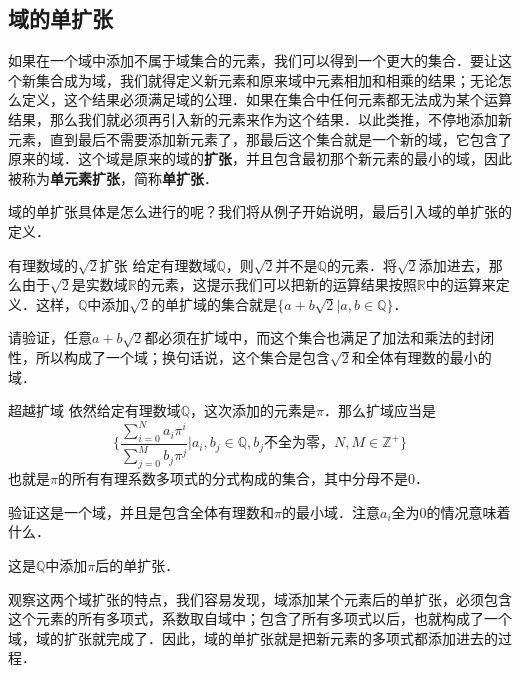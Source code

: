 

\subsection{域的单扩张}
如果在一个域中添加不属于域集合的元素，我们可以得到一个更大的集合．要让这个新集合成为域，我们就得定义新元素和原来域中元素相加和相乘的结果；无论怎么定义，这个结果必须满足域的公理．如果在集合中任何元素都无法成为某个运算结果，那么我们就必须再引入新的元素来作为这个结果．以此类推，不停地添加新元素，直到最后不需要添加新元素了，那最后这个集合就是一个新的域，它包含了原来的域．这个域是原来的域的\textbf{扩张}，并且包含最初那个新元素的最小的域，因此被称为\textbf{单元素扩张}，简称\textbf{单扩张}．

域的单扩张具体是怎么进行的呢？我们将从例子开始说明，最后引入域的单扩张的定义．

\begin{exercise}{有理数域的$\sqrt{2}$扩张}\label{FldExp_exe1}
给定有理数域$\mathbb{Q}$，则$\sqrt{2}$并不是$\mathbb{Q}$的元素．将$\sqrt{2}$添加进去，那么由于$\sqrt{2}$是实数域$\mathbb{R}$的元素，这提示我们可以把新的运算结果按照$\mathbb{R}$中的运算来定义．这样，$\mathbb{Q}$中添加$\sqrt{2}$的单扩域的集合就是$\{a+b\sqrt{2}|a, b\in\mathbb{Q}\}$．

请验证，任意$a+b\sqrt{2}$都必须在扩域中，而这个集合也满足了加法和乘法的封闭性，所以构成了一个域；换句话说，这个集合是包含$\sqrt{2}$和全体有理数的最小的域．
\end{exercise}

\begin{exercise}{超越扩域}\label{FldExp_exe2}
依然给定有理数域$\mathbb{Q}$，这次添加的元素是$\pi$．那么扩域应当是
\begin{equation}
\{\frac{\sum_{i=0}^N a_i\pi^i}{\sum_{j=0}^M b_j\pi^j}|a_i, b_j\in\mathbb{Q}, b_j\text{不全为零，} N, M\in\mathbb{Z}^+\}
\end{equation}
也就是$\pi$的所有有理系数多项式的分式构成的集合，其中分母不是$0$．

验证这是一个域，并且是包含全体有理数和$\pi$的最小域．注意$a_i$全为$0$的情况意味着什么．

这是$\mathbb{Q}$中添加$\pi$后的单扩张．
\end{exercise}

观察这两个域扩张的特点，我们容易发现，域添加某个元素后的单扩张，必须包含这个元素的所有多项式，系数取自域中；包含了所有多项式以后，也就构成了一个域，域的扩张就完成了．因此，域的单扩张就是把新元素的多项式都添加进去的过程．

